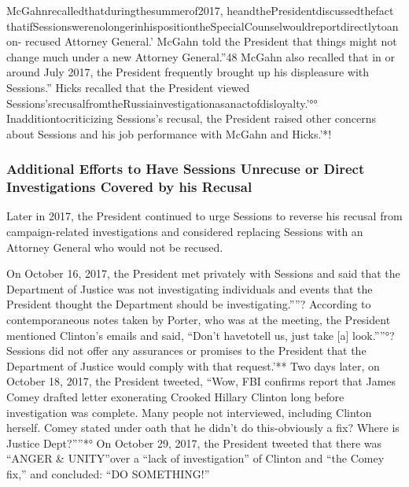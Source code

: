 McGahnrecalledthatduringthesummerof2017, heandthePresidentdiscussedthefact thatifSessionswerenolongerinhispositiontheSpecialCounselwouldreportdirectlytoanon- recused Attorney General.'
McGahn told the President that things might not change much under a new Attorney General.”48
McGahn also recalled that in or around July 2017, the President frequently brought up his displeasure with Sessions.”
Hicks recalled that the President viewed Sessions'srecusalfromtheRussiainvestigationasanactofdisloyalty.'°°
Inadditiontocriticizing Sessions's recusal, the President raised other concerns about Sessions and his job performance with McGahn and Hicks.'*!

\subsubsection{Additional Efforts to Have Sessions Unrecuse or Direct Investigations Covered by his Recusal}

Later in 2017, the President continued to urge Sessions to reverse his recusal from campaign-related investigations and considered replacing Sessions with an Attorney General who would not be recused.

On October 16, 2017, the President met privately with Sessions and said that the Department of Justice was not investigating individuals and events that the President thought the Department should be investigating.””?
According to contemporaneous notes taken by Porter, who was at the meeting, the President mentioned Clinton's emails and said, “Don't havetotell us, just take [a] look.””°?
Sessions did not offer any assurances or promises to the President that the Department of Justice would comply with that request.'**
Two days later, on October 18, 2017, the President tweeted, “Wow, FBI confirms report that James Comey drafted letter exonerating Crooked Hillary Clinton long before investigation was complete.
Many people not interviewed, including Clinton herself.
Comey stated under oath that he didn't do this-obviously a fix? Where is Justice Dept?””*°
On October 29, 2017, the President tweeted that there was “ANGER & UNITY”over a “lack of investigation” of Clinton and “the Comey fix,” and concluded: “DO SOMETHING!”

